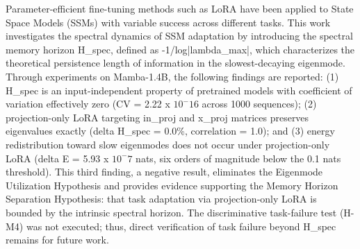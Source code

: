 
Parameter-efficient fine-tuning methods such as LoRA have been applied to State Space Models (SSMs) with variable success across different tasks. This work investigates the spectral dynamics of SSM adaptation by introducing the spectral memory horizon H\_spec, defined as -1/log|lambda\_max|, which characterizes the theoretical persistence length of information in the slowest-decaying eigenmode. Through experiments on Mamba-1.4B, the following findings are reported: (1) H\_spec is an input-independent property of pretrained models with coefficient of variation effectively zero (CV = 2.22 x $10^-16$ across 1000 sequences); (2) projection-only LoRA targeting in\_proj and x\_proj matrices preserves eigenvalues exactly (delta H\_spec = 0.0\%, correlation = 1.0); and (3) energy redistribution toward slow eigenmodes does not occur under projection-only LoRA (delta E = 5.93 x $10^-7$ nats, six orders of magnitude below the 0.1 nats threshold). This third finding, a negative result, eliminates the Eigenmode Utilization Hypothesis and provides evidence supporting the Memory Horizon Separation Hypothesis: that task adaptation via projection-only LoRA is bounded by the intrinsic spectral horizon. The discriminative task-failure test (H-M4) was not executed; thus, direct verification of task failure beyond H\_spec remains for future work.
